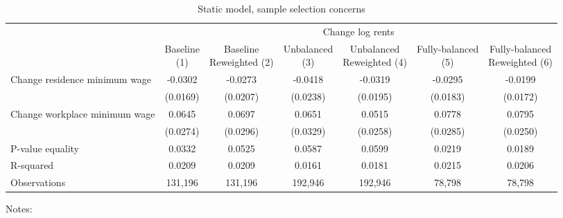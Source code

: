 \begin{table}
    \caption{Static model, sample selection concerns}
    \label{tab:static_sample}

    \begin{tabular}{@{}lcccccc@{}}
        \toprule
                                             & \multicolumn{6}{c}{Change log rents}                                     \\ \cmidrule(l){2-7} 
                                             & \shortstack{Baseline\\(1)}       & \shortstack{Baseline\\Reweighted (2)}
                                             & \shortstack{Unbalanced\\(3)}     & \shortstack{Unbalanced\\Reweighted (4)}
                                             & \shortstack{Fully-balanced\\(5)} & \shortstack{Fully-balanced\\Reweighted (6)}  \\ \midrule
        Change residence minimum wage        & -0.0302      & -0.0273        & -0.0418       & -0.0319      & -0.0295     & -0.0199            \\
                                             & (0.0169)    & (0.0207)      & (0.0238)     & (0.0195)    & (0.0183)   & (0.0172)          \\
        Change workplace minimum wage        & 0.0645      & 0.0697        & 0.0651       & 0.0515      & 0.0778     & 0.0795            \\
                                             & (0.0274)    & (0.0296)      & (0.0329)     & (0.0258)    & (0.0285)   & (0.0250)          \\ \midrule
        P-value equality                     & 0.0332      & 0.0525        & 0.0587       & 0.0599      & 0.0219     & 0.0189            \\
        R-squared                            & 0.0209      & 0.0209        & 0.0161       & 0.0181      & 0.0215     & 0.0206            \\
        Observations                         & 131,196     & 131,196       & 192,946      & 192,946     & 78,798    & 78,798           \\ \bottomrule
    \end{tabular}

    \begin{minipage}{.95\textwidth} \footnotesize
        \vspace{2mm}
        Notes: 
    \end{minipage}
\end{table}
